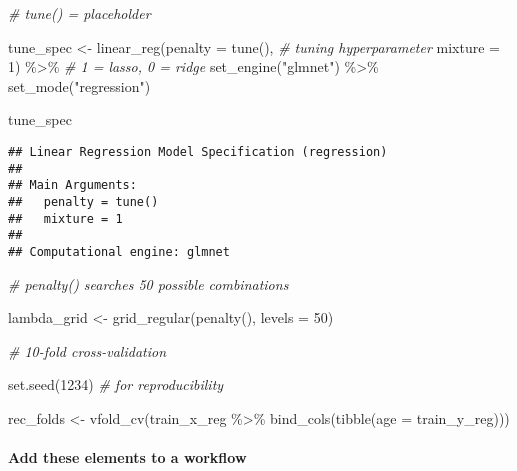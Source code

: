 \documentclass[
]{book}
\newenvironment{Shaded}{\begin{snugshade}}{\end{snugshade}}
\newcommand{\AttributeTok}[1]{\textcolor[rgb]{0.77,0.63,0.00}{#1}}
\newcommand{\CommentTok}[1]{\textcolor[rgb]{0.56,0.35,0.01}{\textit{#1}}}
\newcommand{\DecValTok}[1]{\textcolor[rgb]{0.00,0.00,0.81}{#1}}
\newcommand{\FunctionTok}[1]{\textcolor[rgb]{0.00,0.00,0.00}{#1}}
\newcommand{\NormalTok}[1]{#1}
\newcommand{\OtherTok}[1]{\textcolor[rgb]{0.56,0.35,0.01}{#1}}
\newcommand{\SpecialCharTok}[1]{\textcolor[rgb]{0.00,0.00,0.00}{#1}}
\newcommand{\StringTok}[1]{\textcolor[rgb]{0.31,0.60,0.02}{#1}}
\begin{document}
\begin{Shaded}
\begin{Highlighting}[]
\CommentTok{\# tune() = placeholder }

\NormalTok{tune\_spec }\OtherTok{\textless{}{-}} \FunctionTok{linear\_reg}\NormalTok{(}\AttributeTok{penalty =} \FunctionTok{tune}\NormalTok{(), }\CommentTok{\# tuning hyperparameter }
                        \AttributeTok{mixture =} \DecValTok{1}\NormalTok{) }\SpecialCharTok{\%\textgreater{}\%} \CommentTok{\# 1 = lasso, 0 = ridge }
  \FunctionTok{set\_engine}\NormalTok{(}\StringTok{"glmnet"}\NormalTok{) }\SpecialCharTok{\%\textgreater{}\%}
  \FunctionTok{set\_mode}\NormalTok{(}\StringTok{"regression"}\NormalTok{) }

\NormalTok{tune\_spec}
\end{Highlighting}
\end{Shaded}

\begin{verbatim}
## Linear Regression Model Specification (regression)
## 
## Main Arguments:
##   penalty = tune()
##   mixture = 1
## 
## Computational engine: glmnet
\end{verbatim}

\begin{Shaded}
\begin{Highlighting}[]
\CommentTok{\# penalty() searches 50 possible combinations }

\NormalTok{lambda\_grid }\OtherTok{\textless{}{-}} \FunctionTok{grid\_regular}\NormalTok{(}\FunctionTok{penalty}\NormalTok{(), }\AttributeTok{levels =} \DecValTok{50}\NormalTok{)}

\CommentTok{\# 10{-}fold cross{-}validation}

\FunctionTok{set.seed}\NormalTok{(}\DecValTok{1234}\NormalTok{) }\CommentTok{\# for reproducibility }

\NormalTok{rec\_folds }\OtherTok{\textless{}{-}} \FunctionTok{vfold\_cv}\NormalTok{(train\_x\_reg }\SpecialCharTok{\%\textgreater{}\%} \FunctionTok{bind\_cols}\NormalTok{(}\FunctionTok{tibble}\NormalTok{(}\AttributeTok{age =}\NormalTok{ train\_y\_reg)))}
\end{Highlighting}
\end{Shaded}

\hypertarget{add-these-elements-to-a-workflow}{%
\paragraph{Add these elements to a workflow}\label{add-these-elements-to-a-workflow}}
\end{document}
